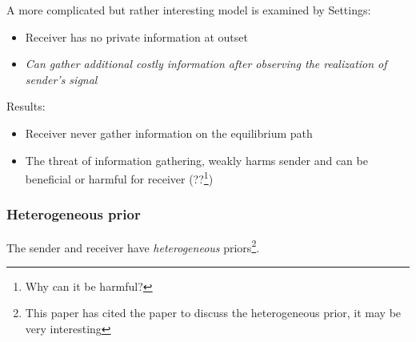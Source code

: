 \documentclass[12pt,letterpaper]{article}
\theoremstyle{definition}   %
\begin{document}
A more complicated but rather interesting model is examined by \cite{matyskova2018bayesian}
Settings:
\begin{itemize}
	\item Receiver has no private information at outset
	\item \emph{Can gather additional costly information after observing the realization of sender's signal}
\end{itemize}
Results:
\begin{itemize}
	\item Receiver never gather information on the equilibrium path
	\item The threat of information gathering, weakly harms sender and can be beneficial or harmful for receiver (??\footnote{Why can it be harmful?})
\end{itemize}

\subsubsection*{Heterogeneous prior}

\cite{alonso2016bayesian}
The sender and receiver have \emph{heterogeneous} priors\footnote{This paper has cited the paper \cite{aumann1966game} to discuss the heterogeneous prior, it may be very interesting}.









\end{document}
